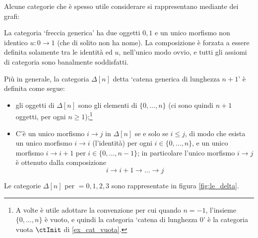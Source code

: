 Alcune categorie che è spesso utile considerare si rappresentano mediante dei grafi:
\begin{example}\label{ex_cat_freccia}
	La categoria `freccia generica' ha due oggetti \(0,1\) e un unico morfismo non identico \(u : 0\to 1\) (che di solito non ha nome). La composizione è forzata a essere definita solamente tra le identità ed \(u\), nell'unico modo ovvio, e tutti gli assiomi di categoria sono banalmente soddisfatti.
\end{example}
\begin{example}\label{ex_cat_catena}
	Più in generale, la categoria \(\Delta[n]\) detta `catena generica di lunghezza \(n+1\)' è definita come segue:
	\begin{itemize}
		\item gli oggetti di \(\Delta[n]\) sono gli elementi di \(\{0,\dots,n\}\) (ci sono quindi \(n+1\) oggetti, per ogni \(n\ge 1\));\footnote{A volte è utile adottare la convenzione per cui quando \(n=-1\), l'insieme \(\{0,\dots,n\}\) è vuoto, e quindi la categoria `catena di lunghezza \(0\)' è la categoria vuota \(\ctInit\) di \ref{ex_cat_vuota}.}
		\item C'è un unico morfismo \(i\to j\) in \(\Delta[n]\) se e solo se \(i\le j\), di modo che esista un unico morfismo \(i\to i\) (l'identità) per ogni \(i\in\{0,\dots,n\}\), e un unico morfismo \(i\to i+1\) per \(i\in\{0,\dots,n-1\}\); in particolare l'unico morfismo \(i\to j\) è ottenuto dalla composizione
		      \[i\to i+1\to\dots\to j\]
	\end{itemize}
	Le categorie \(\Delta[n]\) per \(=0,1,2,3\) sono rappresentate in figura \ref{fig:le_delta}.
	\begin{figure}[h]
		\begin{center}
\end{center}
\end{figure}
\end{example}
